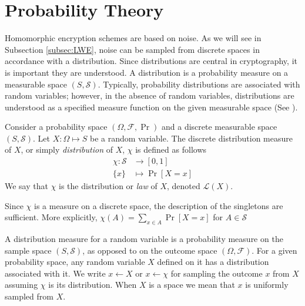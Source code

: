 \chapter{Probability Theory}

Homomorphic encryption schemes are based on noise. As we will see in Subsection \ref{subsec:LWE}, noise can be sampled from discrete spaces in accordance with a distribution. Since distributions are central in cryptography, it is important they are understood. A distribution is a probability measure on a measurable space $(S, \mathcal{S})$. Typically, probability distributions are associated with random variables; however, in the absence of random variables, distributions are understood as a specified measure function on the given measurable space (See \cite[pp. 83]{kallenberg-probability}).
\begin{definition}
Consider a probability space $(\Omega, \mathcal{F}, \operatorname{Pr})$ and a discrete measurable space $(S,\mathcal{S})$. Let $X \colon \Omega \mapsto S$ be a random variable. The discrete distribution measure of $X$, or simply \emph{distribution} of $X$, $\chi$ is defined as follows
\begin{equation*}
\begin{aligned}
    \chi \colon \mathcal{S} &\to [0,1]\\
    \{x\} &\mapsto \operatorname{Pr}[X = x]
\end{aligned}
\end{equation*}
We say that $\chi$ is the distribution or \emph{law} of $X$, denoted $\mathcal{L}(X)$. 
\end{definition}
\begin{remark}
    Since $\chi$ is a measure on a discrete space, the description of the singletons are sufficient. More explicitly, $\chi(A) = \sum_{x \in A} \operatorname{Pr}[X = x]$ for $A \in \mathcal{S}$
\end{remark}
A distribution measure for a random variable is a probability measure on the sample space $(S,\mathcal{S})$, as opposed to on the outcome space $(\Omega, \mathcal{F})$. For a given probability space, any random variable $X$ defined on it has a distribution associated with it. We write $x \leftarrow X$ or $x \leftarrow \chi$ for sampling the outcome $x$ from $X$ assuming $\chi$ is its distribution. When $X$ is a space we mean that $x$ is uniformly sampled from $X$.

